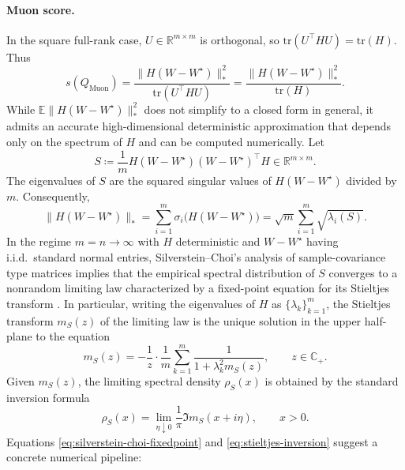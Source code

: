 \documentclass[11pt]{article}
\newcommand{\R}{\mathbb{R}}
\begin{document}
\paragraph{Muon score.}
In the square full-rank case, \({U}\in\R^{m\times m}\) is orthogonal, so \(\mathrm{tr}({U}^\top {H} {U})=\mathrm{tr}({H})\). Thus
\begin{equation}
  \label{eq:score-muon-AAId-simple}
  s({Q}_{\mathrm{Muon}})
  =
  \frac{\|{H}({W}-W^\star)\|_\ast^{2}}{\mathrm{tr}({U}^\top {H} {U})}
  =
  \frac{\|{H}({W}-W^\star)\|_\ast^{2}}{\mathrm{tr}({H})}.
\end{equation}
While $\mathbb{E}\|{H} ({W}-W^\star)\|_\ast^{ 2}$ does not simplify to a closed form in general,
it admits an accurate high-dimensional deterministic approximation that depends only on the spectrum of ${H}$
and can be computed numerically. Let
\[
  {S}
   \coloneqq 
  \frac{1}{m} {H} ({W}-W^\star)({W}-W^\star)^\top {H}
   \in\R^{m\times m}.
\]
The eigenvalues of ${S}$ are the squared singular values of ${H}({W}-W^\star)$ divided by $m$.
Consequently,
\begin{equation}
  \label{eq:nucnorm-from-S}
  \|{H} ({W}-W^\star)\|_\ast
   = 
  \sum_{i=1}^m \sigma_i \big({H}({W}-W^\star)\big)
   = 
  \sqrt{m}\sum_{i=1}^m \sqrt{\lambda_i({S})}.
\end{equation}
In the regime $m=n\to\infty$ with ${H}$ deterministic and ${W}-W^\star$ having i.i.d.\ standard normal entries,
Silverstein--Choi's analysis of sample-covariance type matrices implies that the empirical spectral distribution of ${S}$
converges to a nonrandom limiting law characterized by a fixed-point equation for its Stieltjes transform
\citep{silverstein1995empirical}. In particular, writing the eigenvalues of ${H}$ as $\{\lambda_k\}_{k=1}^{m}$, the Stieltjes transform $m_S(z)$ of the limiting law is the unique solution in the
upper half-plane to the equation
\begin{equation}
  \label{eq:silverstein-choi-fixedpoint}
  m_S(z)
   = 
  - \frac{1}{z}\cdot\frac{1}{m}\sum_{k=1}^{m}\frac{1}{1+\lambda_k^2 m_S(z)},
  \qquad z\in\mathbb{C}_+.
\end{equation}
Given $m_S(z)$, the limiting spectral density $\rho_S(x)$ is obtained by the standard inversion formula
\begin{equation}
  \label{eq:stieltjes-inversion}
  \rho_S(x)
   = 
  \lim_{\eta\downarrow 0}\frac{1}{\pi} \Im  m_S(x+i\eta),
  \qquad x>0.
\end{equation}
Equations \eqref{eq:silverstein-choi-fixedpoint} and \eqref{eq:stieltjes-inversion} suggest a concrete numerical pipeline:
\end{document}
